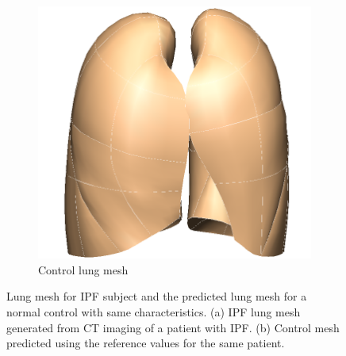 \begin{figure}[htbp]
\begin{subfigure}{.4\linewidth}
  \includegraphics[width=\linewidth,trim={{.0\wd0} {.0\wd0} {.0\wd0} {.0\wd0}},clip]{ModelBasedAnalysis/Image/IPF405_NormalLungMesh.png}
  \caption{Control lung mesh}
  \label{fig:LungShapePrediction-b} 
\end{subfigure}
\caption{Lung mesh for IPF subject and the predicted lung mesh for a normal control with same characteristics. (a) IPF lung mesh generated from CT imaging of a patient with IPF. (b) Control mesh predicted using the reference values for the same patient.}
\label{fig:LungShapePrediction}
\end{figure}

